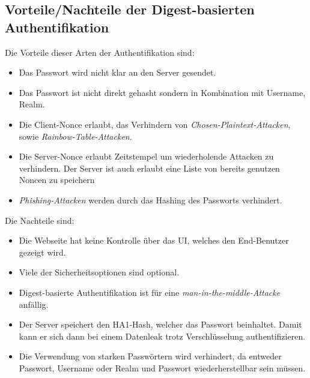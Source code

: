 \documentclass[12pt]{report}
\begin{document}
\subsection{Vorteile/Nachteile der Digest-basierten Authentifikation}
Die Vorteile dieser Arten der Authentifikation sind:
\begin{itemize}
    \item Das Passwort wird nicht klar an den Server gesendet. 
    \item Das Passwort ist nicht direkt gehasht sondern in Kombination mit Username, Realm. 
    \item Die Client-Nonce erlaubt, das Verhindern von \textit{Chosen-Plaintext-Attacken}, sowie \textit{Rainbow-Table-Attacken}. 
    \item Die Server-Nonce erlaubt Zeitstempel um wiederholende Attacken zu verhindern. Der Server ist auch erlaubt eine Liste von bereits genutzen Noncen zu speichern 
    \item \textit{Phishing-Attacken} werden durch das Hashing des Passworts verhindert. 
\end{itemize}
Die Nachteile sind:
\begin{itemize}
    \item Die Webseite hat keine Kontrolle über das UI, welches den End-Benutzer gezeigt wird.
    \item Viele der Sicherheitsoptionen sind optional.
    \item Digest-basierte Authentifikation ist für eine \textit{man-in-the-middle-Attacke} anfällig. 
    \item Der Server speichert den HA1-Hash, welcher das Passwort beinhaltet. Damit kann er sich dann bei einem Datenleak trotz Verschlüsselung authentifizieren. 
    \item Die Verwendung von starken Passwörtern wird verhindert, da entweder Passwort, Username oder Realm und Passwort wiederherstellbar sein müssen. 
\end{itemize}
\end{document}
